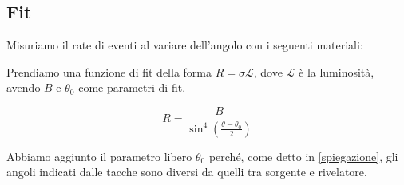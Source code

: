 \subsection{Fit}

Misuriamo il rate di eventi al variare dell'angolo con i seguenti materiali:

Prendiamo una funzione di fit della forma $R=\sigma \mathcal{L}$, dove $\mathcal{L}$ è la luminosità, avendo $B$ e $\theta_0$ come parametri di fit.

\begin{equation}
R=\frac{B}{\sin^4{\left(\frac{\theta-\theta_0}{2}\right)}}
\label{rute}
\end{equation}

Abbiamo aggiunto il parametro libero $\theta_0$ perché, come detto in \autoref{spiegazione}, gli angoli indicati dalle tacche sono diversi da quelli tra sorgente e rivelatore.